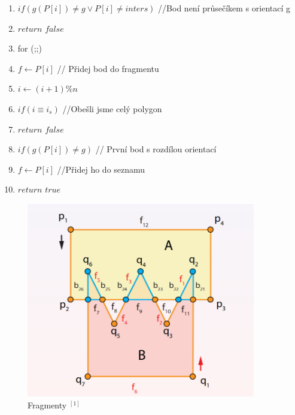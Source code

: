 \documentclass[a4paper, 12pt]{article}
\begin{document}
\begin{enumerate}
	\item  $ if (g(P[i]) \neq g \vee P[i] \neq inters) $ //Bod není průsečíkem s orientací g
	\item \hspace{1cm} $ return $ $ false $ 
	\item for (;;) 
	\item \hspace{1cm} $  f \longleftarrow P[i] $ // Přidej bod do fragmentu
	\item \hspace{1cm} $ i \longleftarrow (i+1)\%n $
	\item \hspace{1cm} $ if (i \equiv i_s) $ //Obešli jsme celý polygon
	\item \hspace{2cm} $ return$  $ false $ 
	\item \hspace{1cm} $ if (g(P[i]) \neq g)  $ // První bod s rozdílou orientací
	\item \hspace{2cm} $ f \longleftarrow P[i] $ //Přidej ho do seznamu
	\item \hspace{2cm} $ return$  $true $

\end{enumerate}

\clearpage

\begin{figure}[h]
	\centering
	\includegraphics[width=10cm]{fragmenty.jpg}
	\caption{Fragmenty $^{[1]}$ }
\end{figure}

\vspace{1cm}
\end{document}

